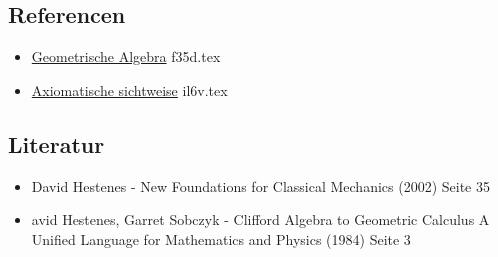 \documentclass{sajzk}
\begin{document}
\subsection{Referencen}
\begin{itemize}
    \item \href{f35d.pdf}{Geometrische Algebra} f35d.tex
    \item \href{il6v.pdf}{Axiomatische sichtweise} il6v.tex
\end{itemize}

\subsection{Literatur}
\begin{itemize}
    \item David Hestenes - New Foundations for Classical Mechanics (2002) Seite 35
    \item avid Hestenes, Garret Sobczyk - Clifford Algebra to Geometric Calculus A Unified Language for Mathematics and Physics (1984) Seite 3
\end{itemize}
\end{document}
